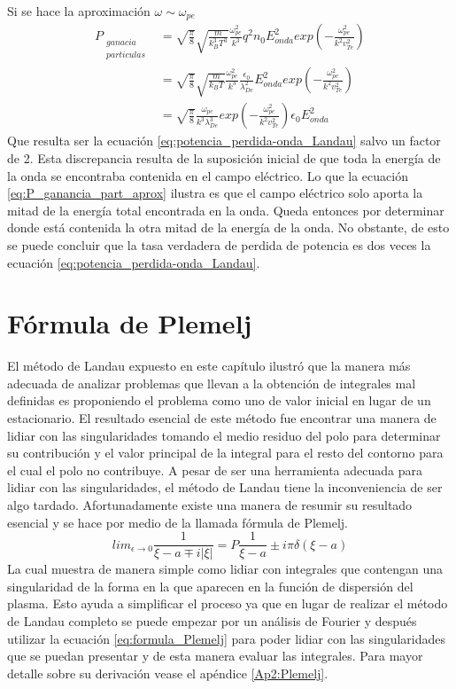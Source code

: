 \documentclass[../tesis_main_file.tex]{subfiles}
\begin{document}
Si se hace la aproximación $\omega \sim \omega_{pe}$
\begin{equation}
\label{eq:P_ganancia_part_aprox}
\begin{split}
P_{\substack{ganacia\\particulas} } &= \sqrt{\frac{\pi}{8}}\sqrt{\frac{m}{k^3_BT^3}}\frac{\omega ^2_{pe}}{k^3}q^2n_0E^2_{onda}exp\left( -\frac{\omega ^2_{pe}}{k^2v^2_{Te}}\right)\\
&=\sqrt{\frac{\pi}{8}}\sqrt{\frac{m}{k_BT}}\frac{\omega ^2_{pe}}{k^3}\frac{\epsilon _0}{\lambda ^2_{De}}E^2_{onda}exp\left( -\frac{\omega ^2_{pe}}{k^2v^2_{Te}}\right)\\
&=\sqrt{\frac{\pi}{8}}\frac{\omega _{pe}}{k^3\lambda ^3_{De}}exp\left( -\frac{\omega ^2_{pe}}{k^2v^2_{Te}}\right) \epsilon _0 E^2_{onda}
\end{split}
\end{equation}
Que resulta ser la ecuación \ref{eq:potencia_perdida-onda_Landau} salvo un factor de 2. Esta discrepancia resulta de la suposición inicial de que toda la energía de la onda se encontraba contenida en el campo eléctrico. Lo que la ecuación \ref{eq:P_ganancia_part_aprox} ilustra es que el campo eléctrico solo aporta la mitad de la energía total encontrada en la onda. Queda entonces por determinar donde está contenida la otra mitad de la energía de la onda. No obstante, de esto se puede concluir que la tasa verdadera de perdida de potencia es dos veces la ecuación \ref{eq:potencia_perdida-onda_Landau}.
\section{Fórmula de Plemelj}
El método de Landau expuesto en este capítulo ilustró que la manera más adecuada de analizar problemas que llevan a la obtención de integrales mal definidas es proponiendo el problema como uno de valor inicial en lugar de un estacionario.
El resultado esencial de este método fue encontrar una manera de lidiar con las singularidades tomando el medio residuo del polo para determinar su contribución y el valor principal de la integral para el resto del contorno para el cual el polo no contribuye.
A pesar de ser una herramienta adecuada para lidiar con las singularidades, el método de Landau tiene la inconveniencia de ser algo tardado. Afortunadamente existe una manera de resumir su resultado esencial y se hace por medio de la llamada fórmula de Plemelj.
\begin{equation}
\label{eq:formula_Plemelj}
lim _{\epsilon \to 0}\frac{1}{\xi -a\mp i|\xi |}=P\frac{1}{\xi -a}\pm i\pi \delta (\xi -a)
\end{equation}
La cual muestra de manera simple como lidiar con integrales que contengan una singularidad de la forma en la que aparecen en la función de dispersión del plasma.
Esto ayuda a simplificar el proceso ya que en lugar de realizar el método de Landau completo se puede empezar por un análisis de Fourier y después utilizar la ecuación \ref{eq:formula_Plemelj} para poder lidiar con las singularidades que se puedan presentar y de esta manera evaluar las integrales.
Para mayor detalle sobre su derivación vease el apéndice \ref{Ap2:Plemelj}.
\end{document}
